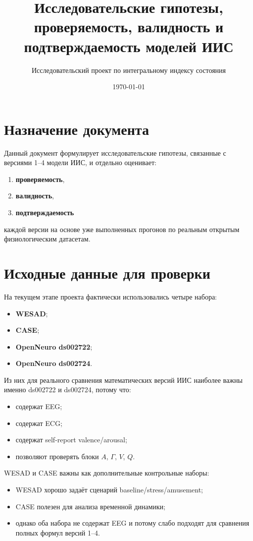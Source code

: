 \documentclass[12pt,a4paper]{article}
\title{Исследовательские гипотезы, проверяемость, валидность и подтверждаемость моделей ИИС}
\author{Исследовательский проект по интегральному индексу состояния}
\date{\today}
\begin{document}
\maketitle

\section{Назначение документа}
Данный документ формулирует исследовательские гипотезы, связанные с версиями 1--4 модели ИИС, и отдельно оценивает:
\begin{enumerate}[leftmargin=1.25cm]
    \item \textbf{проверяемость},
    \item \textbf{валидность},
    \item \textbf{подтверждаемость}
\end{enumerate}
каждой версии на основе уже выполненных прогонов по реальным открытым физиологическим датасетам.

\section{Исходные данные для проверки}
На текущем этапе проекта фактически использовались четыре набора:
\begin{itemize}[leftmargin=1.25cm]
    \item \textbf{WESAD};
    \item \textbf{CASE};
    \item \textbf{OpenNeuro ds002722};
    \item \textbf{OpenNeuro ds002724}.
\end{itemize}

Из них для реального сравнения математических версий ИИС наиболее важны именно ds002722 и ds002724, потому что:
\begin{itemize}[leftmargin=1.25cm]
    \item содержат EEG;
    \item содержат ECG;
    \item содержат self-report valence/arousal;
    \item позволяют проверять блоки $A$, $\Gamma$, $V$, $Q$.
\end{itemize}

WESAD и CASE важны как дополнительные контрольные наборы:
\begin{itemize}[leftmargin=1.25cm]
    \item WESAD хорошо задаёт сценарий baseline/stress/amusement;
    \item CASE полезен для анализа временной динамики;
    \item однако оба набора не содержат EEG и потому слабо подходят для сравнения полных формул версий 1--4.
\end{itemize}
\end{document}
